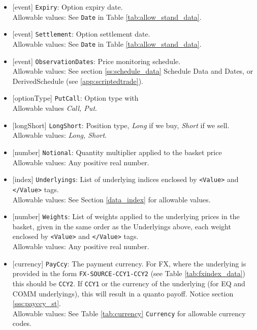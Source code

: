 \begin{itemize}
    \item{}[event] \lstinline!Expiry!: Option expiry date. \\
    Allowable values: See \lstinline!Date! in Table \ref{tab:allow_stand_data}.
    \item{}[event] \lstinline!Settlement!: Option settlement date. \\
    Allowable values: See \lstinline!Date! in Table \ref{tab:allow_stand_data}.
    \item{}[event] \lstinline!ObservationDates!: Price monitoring schedule. \\
    Allowable values: See section \ref{ss:schedule_data} Schedule Data and Dates, or DerivedSchedule (see \ref{app:scriptedtrade}).
    \item{}[optionType] \lstinline!PutCall!: Option type with \\
          Allowable values \emph{Call, Put}.
    \item{}[longShort] \lstinline!LongShort!: Position type,
          {\em Long} if we buy, {\em Short} if we sell.\\
    Allowable values: \emph{Long, Short}.
        \item{}[number] \lstinline!Notional!: Quantity multiplier applied to the
          basket price \\
          Allowable values: Any positive real number.
    \item{}[index] \lstinline!Underlyings!: List of underlying indices
          enclosed by {\tt <Value>} and {\tt </Value>} tags. \\
          Allowable values: See Section \ref{data_index} for allowable values.
     \item{}[number] \lstinline!Weights!: List of weights applied to the
          underlying prices in the basket, given in the same order as
          the Underlyings above, each weight enclosed by {\tt <Value>} and {\tt </Value>} tags.\\
          Allowable values: Any positive real number.
    \item{}[currency] \lstinline!PayCcy!: The payment currency. For FX, where the underlying is provided
      in the form \lstinline!FX-SOURCE-CCY1-CCY2! (see Table \ref{tab:fxindex_data}) this should
      be \lstinline!CCY2!. If \lstinline!CCY1! or the currency of the underlying (for EQ and
      COMM underlyings), this will result in a quanto payoff. Notice section \ref{sss:payccy_st}. \\
        Allowable values: See Table \ref{tab:currency} \lstinline!Currency! for allowable currency codes.
\end{itemize}

